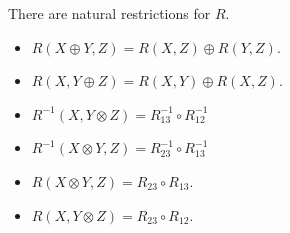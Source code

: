 \documentclass[11pt]{amsart}
\begin{document}
There are natural restrictions for $R$.
\begin{itemize}
    \item $R(X \oplus Y, Z) = R(X, Z) \oplus R(Y, Z)$.
    \item $R(X, Y \oplus Z) = R(X, Y) \oplus R(X, Z)$.
    \item $R^{-1}(X, Y \otimes Z) = R^{-1}_{13} \circ R^{-1}_{12}$ %
    \item $R^{-1}(X \otimes Y, Z) = R^{-1}_{23} \circ R^{-1}_{13}$ %
    \item $R(X \otimes Y, Z) = R_{23} \circ R_{13}$.
    \item $R(X, Y \otimes Z) = R_{23} \circ R_{12}$.
\end{itemize}




\end{document}
